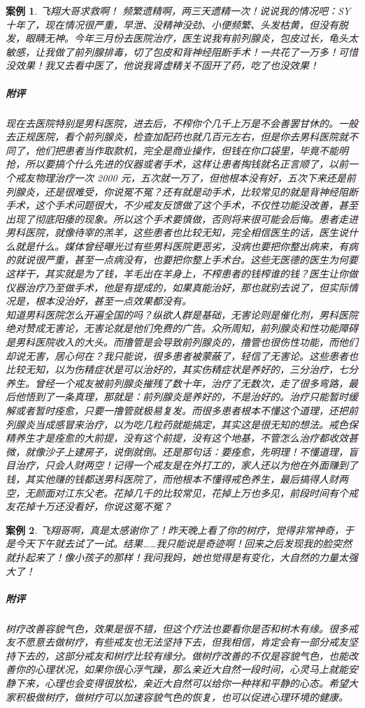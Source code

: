 \documentclass[fontset=founder]{ctexart}
\newtheorem{case}{案例}
\begin{document}
\begin{case}
    飞翔大哥求救啊！ 频繁遗精啊，两三天遗精一次！说说我的情况吧：SY 十年了，现在情况很严重，早泄、没精神没劲、小便频繁、头发枯黄，但没有脱发，眼睛无神。今年三月份去医院治疗，医生说我有前列腺炎，包皮过长，龟头太敏感，让我做了前列腺排毒，切了包皮和背神经阻断手术！一共花了一万多！可惜没效果！我又去看中医了，他说我肾虚精关不固开了药，吃了也没效果！
    \subparagraph{附评} 现在去医院特别是男科医院，进去后，不榨你个几千上万是不会善罢甘休的。一般去正规医院，看个前列腺炎，检查加配药也就几百元左右，但是你去男科医院就不同了，他们把患者当作取款机，完全是商业操作，但钱在你口袋里，毕竟不能明抢，所以要搞个什么先进的仪器或者手术，这样让患者掏钱就名正言顺了，以前一个戒友物理治疗一次 2000 元，五次就一万了，但他根本没有好，五次下来还是前列腺炎，还是很难受，你说冤不冤？还有就是动手术，比较常见的就是背神经阻断手术，这个手术问题很大，不少戒友反馈做了这个手术，不仅性功能没改善，甚至出现了彻底阳痿的现象。所以这个手术要慎做，否则将来很可能会后悔。患者走进男科医院，就像待宰的羔羊，这些患者也比较无知，完全相信医生的话，医生说什么就是什么。媒体曾经曝光过有些男科医院更恶劣，没病也要把你整出病来，有病的就说很严重，甚至一点病没有，也要把你整上手术台。这些无医德的医生为何要这样干，其实就是为了钱，羊毛出在羊身上，不榨患者的钱榨谁的钱？医生让你做仪器治疗乃至做手术，他是有提成的，如果真能治好，那也就别去说了，但实际情况是，根本没治好，甚至一点效果都没有。\\
    知道男科医院怎么开遍全国的吗？纵欲人群是基础，无害论则是催化剂，男科医院绝对赞成无害论，无害论就是他们免费的广告。众所周知，前列腺炎和性功能障碍是男科医院收入的大头。而撸管是会导致前列腺炎的，撸管也很伤性功能，而他们却说无害，居心何在？我只能说，很多患者被蒙蔽了，轻信了无害论。这些患者也比较无知，以为伤精症状是可以治好的，其实伤精症状是养好的，三分治疗，七分养生。曾经一个戒友被前列腺炎摧残了数十年，治疗了无数次，走了很多弯路，最后他悟到了一条真理，那就是：前列腺炎是养好的，不是治好的。治疗只能暂时缓解或者暂时痊愈，只要一撸管就极易复发。而很多患者根本不懂这个道理，还把前列腺炎当成感冒来治疗，以为吃几粒药就能搞定，其实这是很无知的想法。戒色保精养生才是痊愈的大前提，没有这个前提，没有这个地基，不管怎么治疗都收效甚微，就像沙子上建房子，说倒就倒。还是那句话：要痊愈，先明理！不懂道理，盲目治疗，只会人财两空！记得一个戒友是在外打工的，家人还以为他在外面赚到了钱，其实他赚的钱都送男科医院了，而他根本不懂得戒色养生，最后搞得人财两空，无颜面对江东父老。花掉几千的比较常见，花掉上万也多见，前段时间有个戒友花掉十万还没看好，你说这冤不冤？
\end{case}

\begin{case}
    飞翔哥啊，真是太感谢你了！昨天晚上看了你的树疗，觉得非常神奇，于是今天下午就去试了一试。结果……我只能说是奇迹啊！回来之后发现我的脸突然就扑起来了！像小孩子的那样！我问我妈，她也觉得是有变化，大自然的力量太强大了！
    \subparagraph{附评} 树疗改善容貌气色，效果是很不错，但这个疗法也要看你是否和树木有缘。很多戒友不愿意去做树疗，有些戒友也无法坚持下去，但我相信，肯定会有一部分戒友坚持下去的，这部分戒友和树疗比较有缘分。做树疗改善的不仅是容貌气色，也能改善你的心理状况，如果你很心浮气躁，那么亲近大自然一段时间，心灵马上就能安静下来，心理也会变得很放松，亲近大自然可以给你一种祥和平静的心态。希望大家积极做树疗，做树疗可以加速容貌气色的恢复，也可以促进心理环境的健康。
\end{case}
\end{document}
